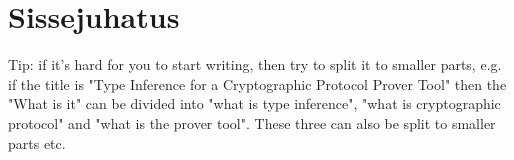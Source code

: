 \section*{Sissejuhatus}


Tip: if it's hard for you to start writing, then try to split it to smaller parts, e.g. if the title is "Type Inference for a Cryptographic Protocol Prover Tool" then the "What is it" can be divided into "what is type inference", "what is cryptographic protocol" and "what is the prover tool". These three can also be split to smaller parts etc.
